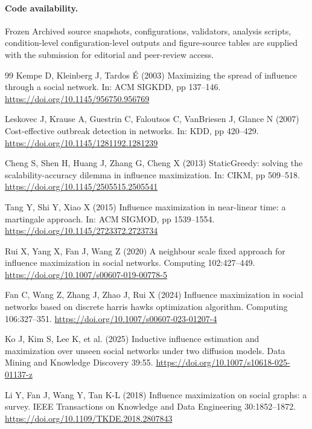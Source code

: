 \documentclass[smallextended]{svjour3}
\providecommand{\DIFaddtex}[1]{{\protect\color{blue} \sf #1}} %
\providecommand{\DIFdeltex}[1]{{\protect\color{red} \scriptsize #1}} %
\providecommand{\DIFaddbegin}{} %
\providecommand{\DIFaddend}{} %
\providecommand{\DIFdelbegin}{} %
\providecommand{\DIFdelend}{} %
\providecommand{\DIFadd}[1]{\texorpdfstring{\DIFaddtex{#1}}{#1}} %
\providecommand{\DIFdel}[1]{\texorpdfstring{\DIFdeltex{#1}}{}} %
\providecommand{\DIFscaledelfig}{0.5}
\newlength{\DIFdelgraphicswidth} %
\newlength{\DIFdelgraphicsheight} %
\providecommand{\DIFaddincludegraphics}[2][]{{\color{blue}\fbox{\DIFOincludegraphics[#1]{#2}}}} %
\providecommand{\DIFdelincludegraphics}[2][]{%
\sbox{\DIFdelgraphicsbox}{\DIFOincludegraphics[#1]{#2}}%
\settoboxwidth{\DIFdelgraphicswidth}{\DIFdelgraphicsbox} %
\settoboxtotalheight{\DIFdelgraphicsheight}{\DIFdelgraphicsbox} %
\scalebox{\DIFscaledelfig}{%
\parbox[b]{\DIFdelgraphicswidth}{\usebox{\DIFdelgraphicsbox}\\[-\baselineskip] \rule{\DIFdelgraphicswidth}{0em}}\llap{\resizebox{\DIFdelgraphicswidth}{\DIFdelgraphicsheight}{%
\setlength{\unitlength}{\DIFdelgraphicswidth}%
\begin{picture}(1,1)%
\thicklines\linethickness{2pt} %
{\color[rgb]{1,0,0}\put(0,0){\framebox(1,1){}}}%
{\color[rgb]{1,0,0}\put(0,0){\line( 1,1){1}}}%
{\color[rgb]{1,0,0}\put(0,1){\line(1,-1){1}}}%
\end{picture}%
}\hspace*{3pt}}} %
} %
\DeclareRobustCommand{\DIFaddbegin}{\DIFOaddbegin \let\includegraphics\DIFaddincludegraphics} %
\DeclareRobustCommand{\DIFaddend}{\DIFOaddend \let\includegraphics\DIFOincludegraphics} %
\DeclareRobustCommand{\DIFdelbegin}{\DIFOdelbegin \let\includegraphics\DIFdelincludegraphics} %
\DeclareRobustCommand{\DIFdelend}{\DIFOaddend \let\includegraphics\DIFOincludegraphics} %
\begin{document}
\paragraph{Code availability.} \DIFdelbegin \DIFdel{Frozen }\DIFdelend \DIFaddbegin \DIFadd{Archived }\DIFaddend source snapshots, configurations, validators, analysis scripts, \DIFdelbegin \DIFdel{condition-level }\DIFdelend \DIFaddbegin \DIFadd{configuration-level }\DIFaddend outputs and figure-source tables are supplied with the submission for editorial and peer-review access.
\begin{thebibliography}{99}
 Kempe D, Kleinberg J, Tardos É (2003) Maximizing the spread of influence through a social network. In: ACM SIGKDD, pp 137--146. \url{https://doi.org/10.1145/956750.956769}

 Leskovec J, Krause A, Guestrin C, Faloutsos C, VanBriesen J, Glance N (2007) Cost-effective outbreak detection in networks. In: KDD, pp 420--429. \url{https://doi.org/10.1145/1281192.1281239}

 Cheng S, Shen H, Huang J, Zhang G, Cheng X (2013) StaticGreedy: solving the scalability-accuracy dilemma in influence maximization. In: CIKM, pp 509--518. \url{https://doi.org/10.1145/2505515.2505541}

 Tang Y, Shi Y, Xiao X (2015) Influence maximization in near-linear time: a martingale approach. In: ACM SIGMOD, pp 1539--1554. \url{https://doi.org/10.1145/2723372.2723734}

 Rui X, Yang X, Fan J, Wang Z (2020) A neighbour scale fixed approach for influence maximization in social networks. Computing 102:427--449. \url{https://doi.org/10.1007/s00607-019-00778-5}

 Fan C, Wang Z, Zhang J, Zhao J, Rui X (2024) Influence maximization in social networks based on discrete harris hawks optimization algorithm. Computing 106:327--351. \url{https://doi.org/10.1007/s00607-023-01207-4}

 Ko J, Kim S, Lee K, et al. (2025) Inductive influence estimation and maximization over unseen social networks under two diffusion models. Data Mining and Knowledge Discovery 39:55. \url{https://doi.org/10.1007/s10618-025-01137-z}

 Li Y, Fan J, Wang Y, Tan K-L (2018) Influence maximization on social graphs: a survey. IEEE Transactions on Knowledge and Data Engineering 30:1852--1872. \url{https://doi.org/10.1109/TKDE.2018.2807843}


\end{thebibliography}
\end{document}
